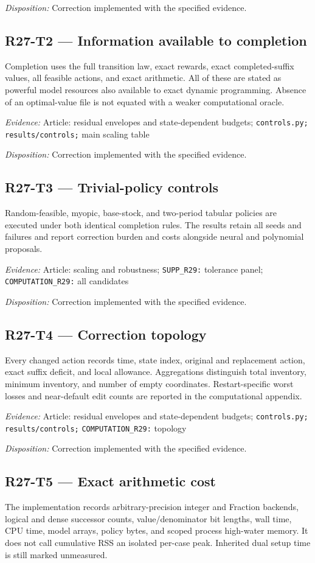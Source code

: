 \emph{Disposition:} Correction implemented with the specified evidence.
\subsection{R27-T2 --- Information available to completion}
Completion uses the full transition law, exact rewards, exact completed-suffix values, all feasible actions, and exact arithmetic. All of these are stated as powerful model resources also available to exact dynamic programming. Absence of an optimal-value file is not equated with a weaker computational oracle.

\emph{Evidence:} Article: residual envelopes and state-dependent budgets; \nolinkurl{controls.py;} \nolinkurl{results/controls;} main scaling table

\emph{Disposition:} Correction implemented with the specified evidence.
\subsection{R27-T3 --- Trivial-policy controls}
Random-feasible, myopic, base-stock, and two-period tabular policies are executed under both identical completion rules. The results retain all seeds and failures and report correction burden and costs alongside neural and polynomial proposals.

\emph{Evidence:} Article: scaling and robustness; \nolinkurl{SUPP_R29:} tolerance panel; \nolinkurl{COMPUTATION_R29:} all candidates

\emph{Disposition:} Correction implemented with the specified evidence.
\subsection{R27-T4 --- Correction topology}
Every changed action records time, state index, original and replacement action, exact suffix deficit, and local allowance. Aggregations distinguish total inventory, minimum inventory, and number of empty coordinates. Restart-specific worst losses and near-default edit counts are reported in the computational appendix.

\emph{Evidence:} Article: residual envelopes and state-dependent budgets; \nolinkurl{controls.py;} \nolinkurl{results/controls;} \nolinkurl{COMPUTATION_R29:} topology

\emph{Disposition:} Correction implemented with the specified evidence.
\subsection{R27-T5 --- Exact arithmetic cost}
The implementation records arbitrary-precision integer and Fraction backends, logical and dense successor counts, value/denominator bit lengths, wall time, CPU time, model arrays, policy bytes, and scoped process high-water memory. It does not call cumulative RSS an isolated per-case peak. Inherited dual setup time is still marked unmeasured.

